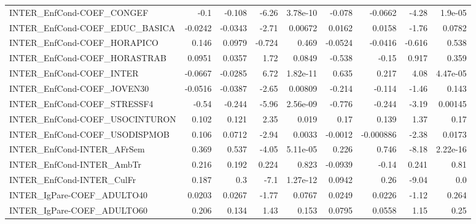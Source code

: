 \begin{tabular}{lrrrrrrrr}
INTER\_EnfCond-COEF\_CONGEF             &        -0.1 &       -0.108 &    -6.26 & 3.78e-10 &     -0.078 &     -0.0662 &        -4.28 &       1.9e-05 \\
INTER\_EnfCond-COEF\_EDUC\_BASICA        &     -0.0242 &      -0.0343 &    -2.71 &  0.00672 &     0.0162 &      0.0158 &        -1.76 &        0.0782 \\
INTER\_EnfCond-COEF\_HORAPICO           &       0.146 &       0.0979 &   -0.724 &    0.469 &    -0.0524 &     -0.0416 &       -0.616 &         0.538 \\
INTER\_EnfCond-COEF\_HORASTRAB          &      0.0951 &       0.0357 &     1.72 &   0.0849 &     -0.538 &       -0.15 &        0.917 &         0.359 \\
INTER\_EnfCond-COEF\_INTER              &     -0.0667 &      -0.0285 &     6.72 & 1.82e-11 &      0.635 &       0.217 &         4.08 &      4.47e-05 \\
INTER\_EnfCond-COEF\_JOVEN30            &     -0.0516 &      -0.0387 &    -2.65 &  0.00809 &     -0.214 &      -0.114 &        -1.46 &         0.143 \\
INTER\_EnfCond-COEF\_STRESSF4           &       -0.54 &       -0.244 &    -5.96 & 2.56e-09 &     -0.776 &      -0.244 &        -3.19 &       0.00145 \\
INTER\_EnfCond-COEF\_USOCINTURON        &       0.102 &        0.121 &     2.35 &    0.019 &       0.17 &       0.139 &         1.37 &          0.17 \\
INTER\_EnfCond-COEF\_USODISPMOB         &       0.106 &       0.0712 &    -2.94 &   0.0033 &    -0.0012 &   -0.000886 &        -2.38 &        0.0173 \\
INTER\_EnfCond-INTER\_AFrSem            &       0.369 &        0.537 &    -4.05 & 5.11e-05 &      0.226 &       0.746 &        -8.18 &      2.22e-16 \\
INTER\_EnfCond-INTER\_AmbTr             &       0.216 &        0.192 &    0.224 &    0.823 &    -0.0939 &       -0.14 &        0.241 &          0.81 \\
INTER\_EnfCond-INTER\_CulFr             &       0.187 &          0.3 &     -7.1 & 1.27e-12 &     0.0942 &        0.26 &        -9.04 &           0.0 \\
INTER\_IgPare-COEF\_ADULTO40            &      0.0203 &       0.0267 &    -1.77 &   0.0767 &     0.0249 &      0.0226 &        -1.12 &         0.264 \\
INTER\_IgPare-COEF\_ADULTO60            &       0.206 &        0.134 &     1.43 &    0.153 &     0.0795 &      0.0558 &         1.15 &          0.25 \\

\end{tabular}
